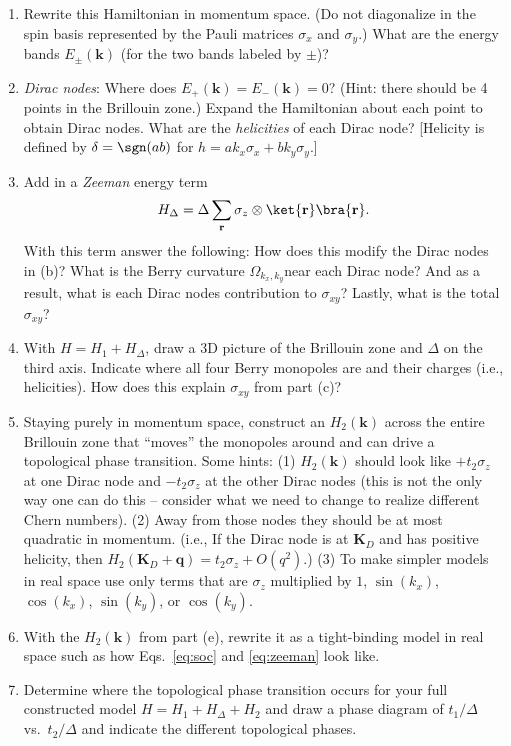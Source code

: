 \documentclass{jhwhw}
\begin{document}
\begin{enumerate}
  \item Rewrite this Hamiltonian in momentum space. (Do not diagonalize in the spin basis represented by the Pauli matrices $\sigma_{x}$ and $\sigma_{y}$.) What are the energy bands $E_{\pm}(\mathbf k)$ (for the two bands labeled by $\pm$)?
  \item \emph{Dirac nodes}: Where does $E_{+}(\mathbf k) = E_{-}(\mathbf k) = 0$? (Hint: there should be 4 points in the Brillouin zone.) Expand the Hamiltonian about each point to obtain Dirac nodes. What are the \emph{helicities} of each Dirac node? [Helicity is defined by $\delta = \sgn(a b)$ for $h = a k_{x }\sigma_{x} + b k_{y}\sigma_{y}$.]
  \item Add in a \emph{Zeeman} energy term
        \begin{equation}
          H_{\Delta} = \Delta \sum_{\mathbf r} \sigma_{z} \otimes \ket{\mathbf r} \bra{\mathbf r}.\label{eq:zeeman}
        \end{equation}
        With this term answer the following:
        How does this modify the Dirac nodes in (b)? What is the Berry curvature $\Omega_{k_{x},k_{y}}$near each Dirac node? And as a result, what is each Dirac nodes contribution to $\sigma_{xy}$? Lastly, what is the total $\sigma_{xy}$?
  \item With $H = H_{1} + H_{\Delta}$, draw a 3D picture of the Brillouin zone and $\Delta$ on the third axis. Indicate where all four Berry monopoles are and their charges (i.e., helicities). How does this explain $\sigma_{xy}$ from part (c)?
  \item Staying purely in momentum space, construct an $H_{2}(\mathbf k)$ across the entire Brillouin zone that ``moves'' the monopoles around and can drive a topological phase transition. Some hints: (1) $H_{2}(\mathbf k)$ should look like $+t_{2} \sigma_{z}$ at one Dirac node and $-t_{2} \sigma_{z}$ at the other Dirac nodes (this is not the only way one can do this -- consider what we need to change to realize different Chern numbers). (2) Away from those nodes they should be at most quadratic in momentum. (i.e., If the Dirac node is at $\mathbf K_{D}$ and has positive helicity, then $H_{2}(\mathbf K_{D} + \mathbf q) = t_{2} \sigma_{z} + O(q^{2})$.) (3) To make simpler models in real space use only terms that are $\sigma_{z}$ multiplied by $1$, $\sin(k_{x})$, $\cos(k_{x})$, $\sin(k_{y})$, or $\cos(k_{y})$.
  \item With the $H_{2}(\mathbf k)$ from part (e), rewrite it as a tight-binding model in real space such as how Eqs.~\eqref{eq:soc} and \eqref{eq:zeeman} look like.
  \item Determine where the topological phase transition occurs for your full constructed model $H = H_{1} + H_{\Delta} + H_{2}$ and draw a phase diagram of $t_{1}/ \Delta$ vs.\ $t_{2}/ \Delta$ and indicate the different topological phases.
\end{enumerate}
\end{document}
